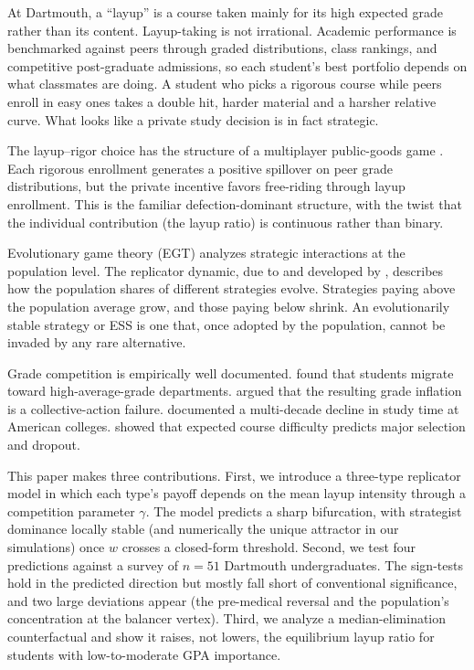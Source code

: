 \documentclass[12pt]{article}
\begin{document}
At Dartmouth, a ``layup'' is a course taken mainly for its high expected
grade rather than its content. Layup-taking is not irrational. Academic
performance is benchmarked against peers through graded distributions,
class rankings, and competitive post-graduate admissions, so each
student's best portfolio depends on what classmates are doing. A
student who picks a rigorous course while peers enroll in easy ones
takes a double hit, harder material and a harsher relative curve. What
looks like a private study decision is in fact strategic.

The layup--rigor choice has the structure of a multiplayer public-goods
game \parencite{hauert2006synergy}. Each rigorous enrollment generates
a positive spillover on peer grade distributions, but the private
incentive favors free-riding through layup enrollment. This is the
familiar defection-dominant structure, with the twist that the
individual contribution (the layup ratio) is continuous rather than
binary.

Evolutionary game theory (EGT) analyzes strategic interactions at the
population level. The replicator dynamic, due to
\textcite{taylor1978evolutionary} and developed by
\textcite{hofbauer1998evolutionary}, describes how the population
shares of different strategies evolve. Strategies paying above the
population average grow, and those paying below shrink. An
evolutionarily stable strategy or ESS \parencite{smith1973logic} is one
that, once adopted by the population, cannot be invaded by any rare
alternative.

Grade competition is empirically well documented.
\textcite{sabot1991grade} found that students migrate toward
high-average-grade departments. \textcite{bok2006underachieving} argued
that the resulting grade inflation is a collective-action failure.
\textcite{babcock2011falling} documented a multi-decade decline in
study time at American colleges. \textcite{stinebrickner2014major}
showed that expected course difficulty predicts major selection and
dropout.

This paper makes three contributions. First, we introduce a three-type
replicator model in which each type's payoff depends on the mean layup
intensity through a competition parameter $\gamma$. The model predicts
a sharp bifurcation, with strategist dominance locally stable (and
numerically the unique attractor in our simulations) once $w$ crosses
a closed-form threshold. Second, we test four predictions
against a survey of $n = 51$ Dartmouth undergraduates. The sign-tests
hold in the predicted direction but mostly fall short of conventional
significance, and two large deviations appear (the pre-medical
reversal and the population's concentration at the balancer vertex).
Third, we analyze a
median-elimination counterfactual and show it raises, not lowers, the
equilibrium layup ratio for students with low-to-moderate GPA importance.
\end{document}
